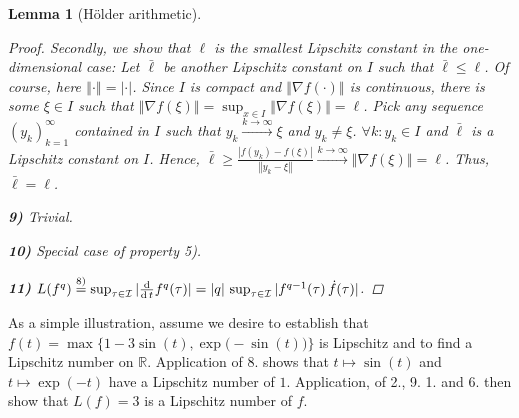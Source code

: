\documentclass{article} %
\newtheorem{lem}[thm]{Lemma}
\theoremstyle{definition}
\theoremstyle{remark}
\newtheorem{ex}[thm]{\textbf{Example}}
\newcommand{\norm}[1]{\left\Vert#1\right\Vert}
\newcommand{\abs}[1]{\left\vert#1\right\vert}
\newcommand{\Real}{\mathbb R}
\newcommand{\dif}[2]{{\operatorname{d}\over\operatorname{d}#2}#1}
\newcommand{\fexp}[1]{\ensuremath{\exp\bigl( #1 \bigr)}}
\newcommand{\indset}{\ensuremath{ \mathcal I}}
\begin{document}
\begin{lem}[H\"older arithmetic]
\begin{proof}
Secondly, we show that $\ell$ is the smallest Lipschitz constant in the one-dimensional case: Let $\bar \ell$ be another Lipschitz constant on $I$ such that $\bar \ell \leq \ell$. Of course, here $\norm{\cdot} = \abs{\cdot}$. Since $I$ is compact and $\norm{\nabla f(\cdot) }$ is continuous, there is some $\xi \in I$ such that $\norm{\nabla f(\xi)} = \sup_{x \in I} \norm{\nabla f(\xi)} = \ell$. Pick any sequence $(y_k)_{k=1}^\infty$ contained in $I$ such that $y_k \stackrel{k \to \infty}{\longrightarrow} \xi$ and $y_k \neq \xi$.
$\forall k: y_k \in I $ and $\bar \ell$ is a Lipschitz constant on $I$. Hence, $ \bar \ell \geq \frac{|f(y_k) - f(\xi)|}{\norm{y_k-\xi}}\stackrel{k \to \infty}{\longrightarrow} \norm{ \nabla f(\xi)} = \ell$. Thus, $\bar \ell = \ell$.

\textbf{9)} Trivial. 

\textbf{10)} Special case of property 5).

\textbf{11)} $L(f^q) \stackrel{8)}{=} \sup_{\tau \in \indset } |\dif{}{t} f^q(\tau)| = |q| \,\sup_{\tau \in \indset } |f^{q-1}(\tau) \, \dot f(\tau)| $. 
\end{proof}
\end{lem} 

As a simple illustration, assume we desire to establish that $f(t) = \max\{ 1- 3 \sin(t), \exp\bigl(- \sin(t) \bigr)\}$ is Lipschitz and to find a Lipschitz number on $\Real$. Application of 8. shows that $t \mapsto \sin(t)$ and $t \mapsto \exp(- t)$ have a Lipschitz number of $1$. Application, of 2., 9. 1. and 6. then show that $L(f) =3$ is a Lipschitz number of $f$.


\end{document}

